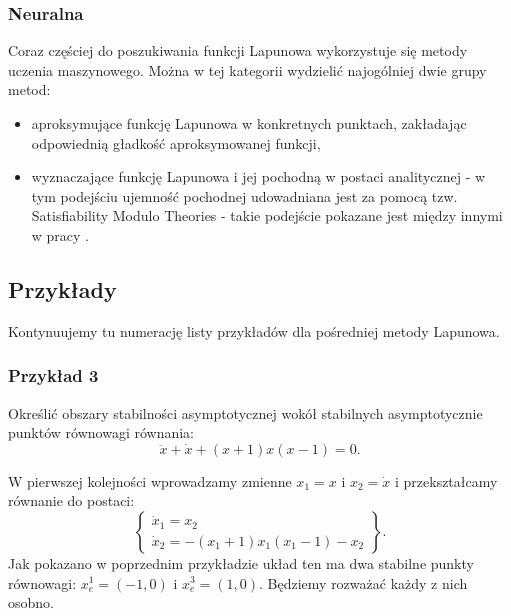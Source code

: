 \documentclass{article}
\begin{document}
        \subsubsection{Neuralna}
        Coraz częściej do poszukiwania funkcji Lapunowa wykorzystuje się metody uczenia maszynowego.
        Można w tej kategorii wydzielić najogólniej dwie grupy metod:
        \begin{itemize}
            \item aproksymujące funkcję Lapunowa w konkretnych punktach, zakładając odpowiednią gładkość aproksymowanej funkcji,
            \item wyznaczające funkcję Lapunowa i jej pochodną w postaci analitycznej - w tym podejściu ujemność pochodnej udowadniana jest za pomocą tzw. Satisfiability Modulo Theories - takie podejście pokazane jest między innymi w pracy \cite{Chang2019}. 
        \end{itemize}        
\newpage
    \subsection{Przykłady}
        Kontynuujemy tu numerację listy przykładów dla pośredniej metody Lapunowa.
        \subsubsection{Przykład 3}
        Określić obszary stabilności asymptotycznej wokół stabilnych asymptotycznie punktów równowagi równania:
        \begin{equation}\label{eq:example_1_sys}
            \ddot{x} + \dot{x} + (x+1)x(x-1) = 0.
        \end{equation}
    
        W pierwszej kolejności wprowadzamy zmienne $x_{1} = x$ i $x_{2} = \dot{x}$ i przekształcamy równanie do postaci:
        \begin{equation}\label{eq:example_1_sys_transformed}
            \left\{
            \begin{array}{l}
                 \dot{x}_{1} = x_{2}\\
                 \dot{x}_{2} = -(x_{1}+1)x_{1}(x_{1}-1) - x_{2}
            \end{array}
            \right\}.
        \end{equation}
        Jak pokazano w poprzednim przykładzie układ ten ma dwa stabilne punkty równowagi: $x_{e}^{1} = (-1, 0)$ i $x_{e}^{3} = (1, 0)$.
        Będziemy rozważać każdy z nich osobno.
\end{document}
